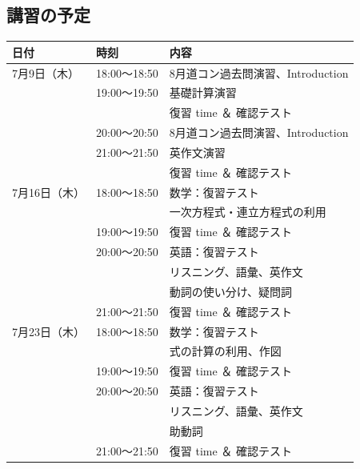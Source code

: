   \subsection{\textbf{講習の予定}}
    \begin{tabular}{l l p{6cm}}
      \toprule
      \textbf{日付} & \textbf{時刻} & \textbf{内容} \\
      \midrule
       {7月9日（木）} & 18:00～18:50 & 8月道コン過去問演習、Introduction\\
                      & 19:00～19:50 & 基礎計算演習\\
                      &              & 復習 time ＆ 確認テスト \\
                      & 20:00～20:50 & 8月道コン過去問演習、Introduction\\
                      & 21:00～21:50 & 英作文演習\\
                      &              & 復習 time ＆ 確認テスト \\
      \midrule
       {7月16日（木）} & 18:00～18:50 & 数学：復習テスト \\
                      &              & \qquad\;\; 一次方程式・連立方程式の利用\\
                      & 19:00～19:50 & \qquad\;\; 復習 time ＆ 確認テスト\\
                      & 20:00～20:50 & 英語：復習テスト \\
                      &              & \qquad\;\; リスニング、語彙、英作文\\
                      &              & \qquad\;\; 動詞の使い分け、疑問詞 \\
                      & 21:00～21:50 & \qquad\;\; 復習 time ＆ 確認テスト\\
      \midrule
       {7月23日（木）} & 18:00～18:50 & 数学：復習テスト \\
                      &              & \qquad\;\; 式の計算の利用、作図\\
                      & 19:00～19:50 & \qquad\;\; 復習 time ＆ 確認テスト\\
                      & 20:00～20:50 & 英語：復習テスト \\
                      &              & \qquad\;\; リスニング、語彙、英作文\\
                      &              & \qquad\;\; 助動詞\\
                      & 21:00～21:50 & \qquad\;\; 復習 time ＆ 確認テスト\\

\end{tabular}
